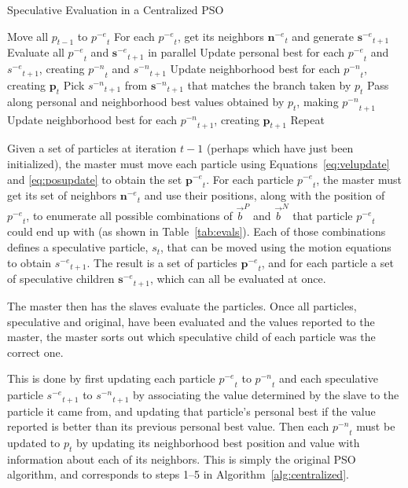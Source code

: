 \documentclass[journal,letterpaper]{IEEEtran}
\newcommand{\alg}[1]{Algorithm~\ref{alg:#1}}
\providecommand{\pers}{\ensuremath{P}}
\providecommand{\neigh}{\ensuremath{N}}
\providecommand{\nbest}{\ensuremath{\Vec{b}^\neigh}}
\providecommand{\pbest}{\ensuremath{\Vec{b}^\pers}}
\providecommand{\noeval}[1]{\ensuremath{#1^{-e}}}
\providecommand{\nonbest}[1]{\ensuremath{#1^{-n}}}
\providecommand{\p}{\ensuremath{p}}
\providecommand{\pset}{\ensuremath{\mathbf{p}}}
\providecommand{\s}{\ensuremath{s}}
\providecommand{\sset}{\ensuremath{\mathbf{s}}}
\providecommand{\nset}{\ensuremath{\mathbf{n}}}
\begin{document}
\begin{algorithm}
  \caption{Speculative Evaluation in a Centralized PSO}
  \label{alg:centralized}
  \begin{algorithmic}[1]
	\STATE Move all $\p_{t-1}$ to $\noeval{\p}_t$
	\STATE For each $\noeval{\p}_t$, get its neighbors $\noeval{\nset}_t$ and
	  generate $\noeval{\sset}_{t+1}$
	\STATE Evaluate all $\noeval{\p}_t$ and $\noeval{\sset}_{t+1}$ in parallel
	\STATE Update personal best for each $\noeval{\p}_t$ and
	  $\noeval{\s}_{t+1}$, creating $\nonbest{\p}_t$ and $\nonbest{\s}_{t+1}$
	\STATE Update neighborhood best for each $\nonbest{\p}_t$, creating
	  $\pset_t$
	\FORALL{$\p_t$}
	\STATE Pick $\nonbest{\s}_{t+1}$ from $\nonbest{\sset}_{t+1}$ that matches
	  the branch taken by $\p_t$
	\STATE Pass along personal and neighborhood best values obtained by $\p_t$,
	  making $\nonbest{\p}_{t+1}$
	\ENDFOR
	\STATE Update neighborhood best for each $\nonbest{\p}_{t+1}$, creating
	  $\pset_{t+1}$
	\STATE Repeat
  \end{algorithmic}
\end{algorithm}

Given a set of particles at iteration $t-1$ (perhaps which have just been
initialized), the master must move each particle using
Equations~\eqref{eq:velupdate} and \eqref{eq:posupdate} to obtain the set
$\noeval{\pset}_t$.  For each particle $\noeval{\p}_t$, the master must get its
set of neighbors $\noeval{\nset}_t$ and use their positions, along with the
position of $\noeval{\p}_t$, to enumerate all possible combinations of $\pbest$
and $\nbest$ that particle $\noeval{\p}_t$ could end up with (as shown in
Table~\ref{tab:evals}).  Each of those combinations defines a speculative
particle, $\s_t$, that can be moved using the motion equations to obtain
$\noeval{\s}_{t+1}$.  The result is a set of particles $\noeval{\pset}_t$, and
for each particle a set of speculative children $\noeval{\sset}_{t+1}$, which
can all be evaluated at once.

The master then has the slaves evaluate the particles.  Once all particles,
speculative and original, have been evaluated and the values reported to the
master, the master sorts out which speculative child of each particle was the
correct one.

This is done by first updating each particle $\noeval{\p}_t$ to
$\nonbest{\p}_t$ and each speculative particle $\noeval{\s}_{t+1}$ to
$\nonbest{\s}_{t+1}$ by associating the value determined by the slave to the
particle it came from, and updating that particle's personal best if the value
reported is better than its previous personal best value.  Then each
$\nonbest{\p}_t$ must be updated to $\p_t$ by updating its neighborhood best
position and value with information about each of its neighbors.  This is
simply the original PSO algorithm, and corresponds to steps 1--5 in
\alg{centralized}.
\end{document}
